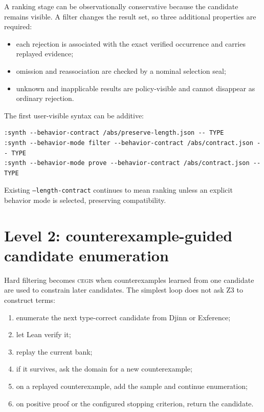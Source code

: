 \documentclass[11pt,oneside]{report}
\newcommand{\CEGIS}{\textsc{cegis}\xspace}
\newcommand{\code}[1]{\texttt{#1}}
\begin{document}
A ranking stage can be observationally conservative because the candidate remains visible. A filter changes the result set, so three additional properties are required:

\begin{itemize}[leftmargin=2em]
\item each rejection is associated with the exact verified occurrence and carries replayed evidence;
\item omission and reassociation are checked by a nominal selection seal;
\item unknown and inapplicable results are policy-visible and cannot disappear as ordinary rejection.
\end{itemize}

The first user-visible syntax can be additive:

\begin{lstlisting}[language={},caption={Illustrative Leant command forms.}]
:synth --behavior-contract /abs/preserve-length.json -- TYPE
:synth --behavior-mode filter --behavior-contract /abs/contract.json -- TYPE
:synth --behavior-mode prove --behavior-contract /abs/contract.json -- TYPE
\end{lstlisting}

Existing \code{--length-contract} continues to mean ranking unless an explicit behavior mode is selected, preserving compatibility.

\section{Level 2: counterexample-guided candidate enumeration}
\label{sec:candidate-cegis}

Hard filtering becomes \CEGIS when counterexamples learned from one candidate are used to constrain later candidates. The simplest loop does not ask Z3 to construct terms:

\begin{enumerate}[leftmargin=2em]
\item enumerate the next type-correct candidate from Djinn or Exference;
\item let Lean verify it;
\item replay the current bank;
\item if it survives, ask the domain for a new counterexample;
\item on a replayed counterexample, add the sample and continue enumeration;
\item on positive proof or the configured stopping criterion, return the candidate.
\end{enumerate}
\end{document}
